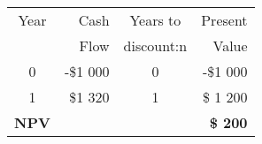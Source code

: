 \begin{tabular}{|c|r|c|r|}
\hline
Year  & Cash & Years to & Present \\
 & Flow & discount:n & Value \\
\hline
0 & -\$1 000 & 0 & -\$1 000 \\
1 &  \$1 320 & 1 & \$ 1 200 \\
\textbf{NPV} &  &  & \textbf{\$   200} \\
\hline
\end{tabular}
